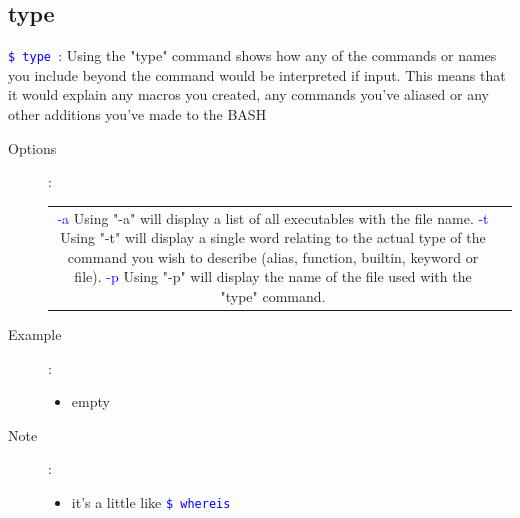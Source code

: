 \documentclass[a4paper,12pt,twoside]{book}
\newcommand{\linuxcommand}[1]{\texttt{\textcolor{blue}{\$ #1 \Pisymbol{psy}{191}}}}
\newcommand{\op}[1]{\textcolor{blue}{-#1}}
\begin{document}
\begin{CJK*}{UTF8}{song}
\section{type}
	\linuxcommand{type }: Using the "type" command shows how any of the commands or names you include beyond the command would be interpreted if input. This means that it would explain any macros you created, any commands you've aliased or any other additions you've made to the BASH
	\begin{description}
	\item[Options]: \\
		\begin{tabular}{c|p{}}
		\hline
		\op{a} Using "-a" will display a list of all executables with the file name.
		\op{t} Using "-t" will display a single word relating to the actual type of the command you wish to describe (alias, function, builtin, keyword or file).
		\op{p} Using "-p" will display the name of the file used with the "type" command.
		\end{tabular}
	\item[Example]:
		\begin{itemize}
		\item empty
		\end{itemize}
	\item[Note]:
		\begin{itemize}
		\item it's a little like \linuxcommand{whereis}
		\end{itemize}
	\end{description}


\end{CJK*}
\end{document}
